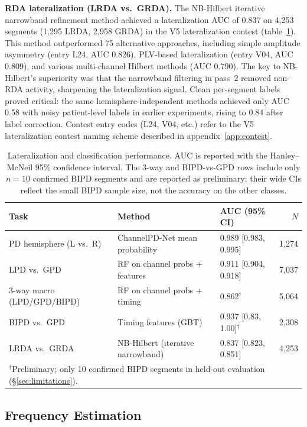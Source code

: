\documentclass{iopjournal}
\begin{document}
\textbf{RDA lateralization (LRDA vs.\ GRDA).} The NB-Hilbert iterative narrowband refinement method achieved a lateralization AUC of 0.837 on 4,253 segments (1,295 LRDA, 2,958 GRDA) in the V5 lateralization contest (table~\ref{tab:lateralization}). This method outperformed 75 alternative approaches, including simple amplitude asymmetry (entry L24, AUC 0.826), PLV-based lateralization (entry V04, AUC 0.809), and various multi-channel Hilbert methods (AUC 0.790). The key to NB-Hilbert's superiority was that the narrowband filtering in pass~2 removed non-RDA activity, sharpening the lateralization signal. Clean per-segment labels proved critical: the same hemisphere-independent methods achieved only AUC 0.58 with noisy patient-level labels in earlier experiments, rising to 0.84 after label correction. Contest entry codes (L24, V04, etc.) refer to the V5 lateralization contest naming scheme described in appendix~\ref{app:contest}.

\begin{table}[t]
\caption{Lateralization and classification performance. AUC is reported with the Hanley--McNeil 95\% confidence interval. The 3-way and BIPD-vs-GPD rows include only $n=10$ confirmed BIPD segments and are reported as preliminary; their wide CIs reflect the small BIPD sample size, not the accuracy on the other classes.}
\centering
\begin{tabular}{l l l r}
\hline
Task & Method & AUC (95\% CI) & $N$ \\
\hline
PD hemisphere (L vs.\ R) & ChannelPD-Net mean probability & 0.989 [0.983, 0.995] & 1,274 \\
LPD vs.\ GPD & RF on channel probs + features & 0.911 [0.904, 0.918] & 7,037 \\
3-way macro (LPD/GPD/BIPD) & RF on channel probs + timing & 0.862$^\dagger$ & 5,064 \\
BIPD vs.\ GPD & Timing features (GBT) & 0.937 [0.83, 1.00]$^\dagger$ & 2,308 \\
LRDA vs.\ GRDA & NB-Hilbert (iterative narrowband) & 0.837 [0.823, 0.851] & 4,253 \\
\hline
\multicolumn{4}{l}{\footnotesize $^\dagger$Preliminary; only 10 confirmed BIPD segments in held-out evaluation (\S\ref{sec:limitations}).} \\
\end{tabular}
\label{tab:lateralization}
\end{table}

\subsection{Frequency Estimation}
\label{sec:frequency}
\end{document}

